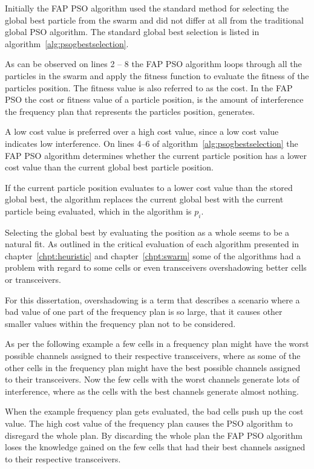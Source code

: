 Initially the FAP PSO algorithm used the standard method for selecting the global best particle from the swarm and did not differ at all from the traditional global PSO algorithm. The standard global best selection is listed in algorithm~\ref{alg:psogbestselection}. 

As can be observed on lines 2 -- 8 the FAP PSO algorithm loops through all the particles in the swarm and apply the fitness function to evaluate the fitness of the particles position. The fitness value is also referred to as the cost. In the FAP PSO the cost or fitness value of a particle position, is the amount of interference the frequency plan that represents the particles position, generates.

A low cost value is preferred over a high cost value, since a low cost value indicates low interference. On lines 4--6 of algorithm~\ref{alg:psogbestselection} the FAP PSO algorithm determines whether the current particle position has a lower cost value than the current global best particle position.

If the current particle position evaluates to a lower cost value than the stored global best, the algorithm replaces the current global best with the current particle being evaluated, which in the algorithm is $p_i$.

Selecting the global best by evaluating the position as a whole seems to be a natural fit. As outlined in the critical evaluation of each algorithm presented in chapter~\ref{chpt:heuristic} and chapter~\ref{chpt:swarm} some of the algorithms had a problem with regard to some cells or even transceivers overshadowing better cells or transceivers.

For this dissertation, overshadowing is a term that describes a scenario where a bad value of one part of the frequency plan is so large, that it causes other smaller values within the frequency plan not to be considered. 

As per the following example a few cells in a frequency plan might have the worst possible channels assigned to their respective transceivers, where as some of the other cells in the frequency plan might have the best possible channels assigned to their transceivers. Now the few cells with the worst channels generate lots of interference, where as the cells with the best channels generate almost nothing.

When the example frequency plan gets evaluated, the bad cells push up the cost value. The high cost value of the frequency plan causes the PSO algorithm to disregard the whole plan. By discarding the whole plan the FAP PSO algorithm loses the knowledge gained on the few cells that had their best channels assigned to their respective transceivers.

